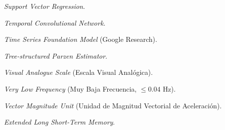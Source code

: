 \begin{description}[font=\bfseries, leftmargin=3.2cm, style=multiline]
    \item[SVR] \textit{Support Vector Regression}.
    \item[TCN] \textit{Temporal Convolutional Network}.
    \item[TimesFM] \textit{Time Series Foundation Model} (Google Research).
    \item[TPE] \textit{Tree-structured Parzen Estimator}.
    \item[VAS] \textit{Visual Analogue Scale} (Escala Visual Analógica).
    \item[VLF] \textit{Very Low Frequency} (Muy Baja Frecuencia, $\le 0.04$ Hz).
    \item[VMU] \textit{Vector Magnitude Unit} (Unidad de Magnitud Vectorial de Aceleración).
    \item[xLSTM] \textit{Extended Long Short-Term Memory}.
\end{description}
